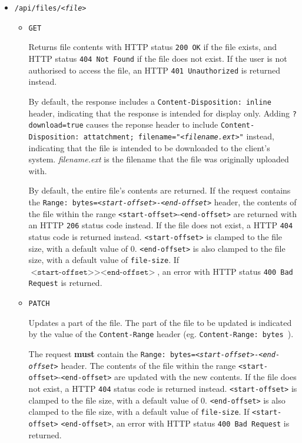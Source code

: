 \documentclass[12pt,a4paper]{report}
\begin{document}
\begin{itemize}
	\item \texttt{/api/files/\textsl{<file>}}

	      \begin{itemize}
		      \item \texttt{GET}

		            Returns file contents with HTTP status \texttt{200 OK} if the file exists, and HTTP status \texttt{404 Not Found} if the file does not exist.
		            If the user is not authorised to access the file, an HTTP \texttt{401 Unauthorized} is returned instead.

		            By default, the response includes a \texttt{Content-Disposition: inline} header, indicating that the response is intended for display only.
		            Adding \texttt{?download=true} causes the reponse header to include \texttt{Content-Disposition: attatchment; filename="\textsl{<filename.ext>}"} instead, indicating that the file is intended to be downloaded to the client's system. \textsl{filename.ext} is the filename that the file was originally uploaded with.

		            By default, the entire file's contents are returned.
		            If the request contains the \texttt{Range: bytes=\textsl{<start-offset>}-\textsl{<end-offset>}} header, the contents of the file within the range \texttt{<start-offset>}-\texttt{<end-offset>} are returned with an HTTP \texttt{206} status code instead.
		            If the file does not exist, a HTTP \texttt{404} status code is returned instead.
		            \texttt{<start-offset>} is clamped to the file size, with a default value of 0.
		            \texttt{<end-offset>} is also clamped to the file size, with a default value of \texttt{file-size}.
		            If $\texttt{<start-offset>} > \texttt{<end-offset>}$, an error with HTTP status \texttt{400 Bad Request} is returned.

		      \item \texttt{PATCH}

		            Updates a part of the file.
		            The part of the file to be updated is indicated by the value of the \texttt{Content-Range} header (eg. \texttt{Content-Range: bytes }).

		            The request \textbf{must} contain the \texttt{Range: bytes=\textsl{<start-offset>}-\textsl{<end-offset>}} header.
		            The contents of the file within the range \texttt{<start-offset>}-\texttt{<end-offset>} are updated with the new contents.
		            If the file does not exist, a HTTP \texttt{404} status code is returned instead.
		            \texttt{<start-offset>} is clamped to the file size, with a default value of 0.
		            \texttt{<end-offset>} is also clamped to the file size, with a default value of \texttt{file-size}.
		            If \texttt{<start-offset>} \> \texttt{<end-offset>}, an error with HTTP status \texttt{400 Bad Request} is returned.


\end{itemize}
\end{itemize}
\end{document}
